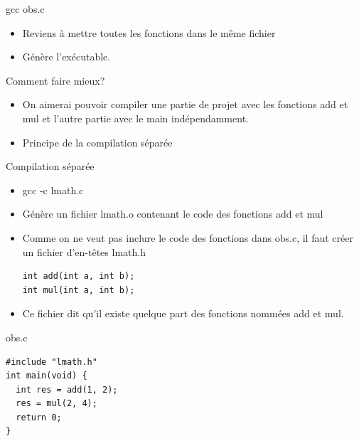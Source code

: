 \begin{frame}[containsverbatim]{\ftitle}
\def\blocktitle{gcc obs.c}
\begin{block}{\blocktitle}
\begin{itemize}
\item Reviens à mettre toutes les fonctions dans le même fichier
\item Génère l'exécutable.
\end{itemize}
\end{block}


\def\blocktitle{Comment faire mieux?}
\begin{alertblock}{\blocktitle}
\begin{itemize}
\item On aimerai pouvoir compiler une partie de projet avec les fonctions add et mul et l'autre partie avec le main indépendamment.
\item Principe de la compilation séparée
\end{itemize}
\end{alertblock}
\end{frame}

\begin{frame}[containsverbatim]{\ftitle}
\def\blocktitle{Compilation séparée}
\begin{block}{\blocktitle}
\begin{itemize}
\item gcc -c lmath.c
\item Génère un fichier lmath.o contenant le code des fonctions add et mul
\item Comme on ne veut pas inclure le code des fonctions dans obs.c, il faut créer un fichier d'en-têtes lmath.h
\begin{verbatim}
int add(int a, int b);
int mul(int a, int b);
\end{verbatim}
\item Ce fichier dit qu'il existe quelque part des fonctions nommées add et mul.
\end{itemize}
\end{block}
\def\blocktitle{obs.c}
\begin{block}{\blocktitle}\begin{verbatim}
#include "lmath.h"
int main(void) {
  int res = add(1, 2);
  res = mul(2, 4);
  return 0;
}
\end{verbatim}
\end{block}
\end{frame}


